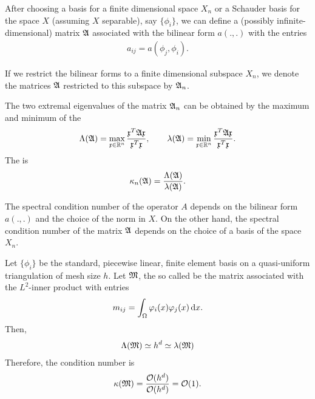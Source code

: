 \begin{notation}
  After choosing a basis for a finite dimensional space $X_n$ or a
  Schauder basis for the space $X$ (assuming $X$ separable), say
  $\{\phi_i\}$, we can define a (possibly infinite-dimensional) matrix
  $\mathfrak{A}$ associated with the bilinear form $a(.,.)$ with the entries
  \begin{gather*}
    a_{i j} = a(\phi_j, \phi_i).
  \end{gather*}
  
  If we restrict the bilinear forms to a finite dimensional subspace
  $X_n$, we denote the matrices $\mathfrak{A}$ restricted to this subspace
  by $\mathfrak{A}_n$.
\end{notation}

\begin{definition}
  The two extremal eigenvalues of the matrix $\mathfrak{A}_n$ can be
  obtained by the maximum and minimum of the 
  \begin{gather}
    \label{eq:itintro:3}
    \Lambda(\mathfrak{A}) = \max_{\mathfrak{x}\in \mathbb R^n}\frac{\mathfrak{x}^T \mathfrak{A} \mathfrak{x}}{\mathfrak{x}^T\mathfrak{x}},
    \qquad
    \lambda(\mathfrak{A}) = \min_{\mathfrak{x}\in \mathbb R^n}\frac{\mathfrak{x}^T \mathfrak{A} \mathfrak{x}}{\mathfrak{x}^T\mathfrak{x}}.
  \end{gather}
  The  is
  \begin{gather*}
    \kappa_n(\mathfrak{A}) = \frac{\Lambda(\mathfrak{A})}{\lambda(\mathfrak{A})}.
  \end{gather*}
\end{definition}

\begin{note}
  The spectral condition number of the operator $A$ depends on the
  bilinear form $a(.,.)$ and the choice of the norm in $X$. On the
  other hand, the spectral condition number of the matrix $\mathfrak{A}$
  depends on the choice of a basis of the space $X_n$.
\end{note}

\begin{lemma}
  \label{lemma:itintro:1}
  Let $\{\phi_i\}$ be the standard, piecewise linear, finite element
  basis on a quasi-uniform triangulation of mesh size $h$. Let $\mathfrak{M}$, the so called  be the matrix associated with
  the $L^2$-inner product with entries
  \begin{gather*}
    m_{ij} = \int_\Omega \varphi_i(x) \varphi_j(x) \,\mathrm{d} x.
  \end{gather*}
  Then,
  \begin{gather*}
    \Lambda(\mathfrak{M}) \simeq h^{d} \simeq  \lambda(\mathfrak{M})
  \end{gather*}
  Therefore, the condition number is
  \begin{gather*}
    \kappa(\mathfrak{M}) = \frac{\mathcal O(h^{d})}{\mathcal O(h^{d})} = {\mathcal O(1)}.
  \end{gather*}
\end{lemma}

